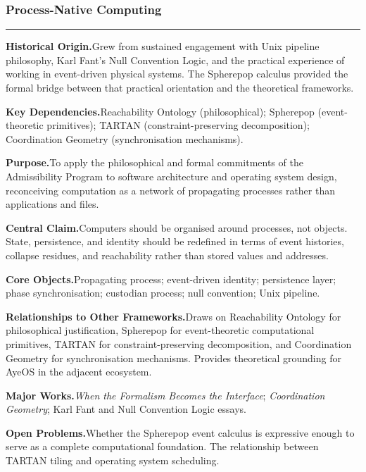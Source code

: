\documentclass[12pt, twoside]{article}
\newcommand{\frameworkhead}[5]{  \subsubsection{#1}
  \noindent\textcolor{#2}{\rule{\linewidth}{0.8pt}}
  \smallskip

  \noindent\textbf{Historical Origin.}\quad #3

  \noindent\textbf{Key Dependencies.}\quad #4

  \noindent\textbf{Purpose.}\quad #5
}
\newcommand{\frameworkbody}[5]{  \noindent\textbf{Central Claim.}\quad #1

  \noindent\textbf{Core Objects.}\quad #2

  \noindent\textbf{Relationships to Other Frameworks.}\quad #3

  \noindent\textbf{Major Works.}\quad #4

  \noindent\textbf{Open Problems.}\quad #5
  \medskip
}
\begin{document}
\frameworkhead{Process-Native Computing}{integgold}{Grew from sustained engagement with Unix pipeline philosophy, Karl Fant's
Null Convention Logic, and the practical experience of working in
event-driven physical systems. The Spherepop calculus provided the formal
bridge between that practical orientation and the theoretical frameworks.}{Reachability Ontology (philosophical); Spherepop (event-theoretic
primitives); TARTAN (constraint-preserving decomposition); Coordination
Geometry (synchronisation mechanisms).}{To apply the philosophical and formal commitments of the Admissibility
Program to software architecture and operating system design, reconceiving
computation as a network of propagating processes rather than applications
and files.}
\frameworkbody{Computers should be organised around processes, not objects. State,
persistence, and identity should be redefined in terms of event histories,
collapse residues, and reachability rather than stored values and addresses.}{Propagating process; event-driven identity; persistence layer; phase
synchronisation; custodian process; null convention; Unix pipeline.}{Draws on Reachability Ontology for philosophical justification, Spherepop
for event-theoretic computational primitives, TARTAN for constraint-preserving
decomposition, and Coordination Geometry for synchronisation mechanisms.
Provides theoretical grounding for AyeOS in the adjacent ecosystem.}{\emph{When the Formalism Becomes the Interface}; \emph{Coordination
Geometry}; Karl Fant and Null Convention Logic essays.}{Whether the Spherepop event calculus is expressive enough to serve as a
complete computational foundation. The relationship between TARTAN tiling and
operating system scheduling.}
\end{document}
